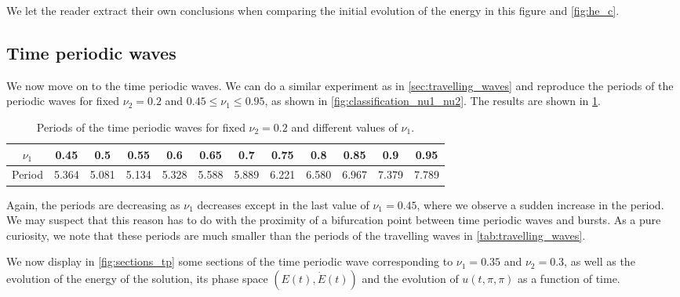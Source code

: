 \documentclass[twoside]{article}
\begin{document}
We let the reader extract their own conclusions when comparing the initial evolution of the energy in this figure and \cref{fig:he_c}.
\subsection{Time periodic waves}\label{sec:time_periodic_waves}
We now move on to the time periodic waves. We can do a similar experiment as in \cref{sec:travelling_waves} and reproduce the periods of the periodic waves for fixed $\nu_2=0.2$ and $0.45\leq \nu_1\leq 0.95$, as shown in \cref{fig:classification_nu1_nu2}. The results are shown in \cref{tab:time_periodic_waves}.

\begin{table}[ht]
  \centering
  \begin{tabular}{|c||ccccccccccc|}
    \hline
    $\nu_1$ & 0.45  & 0.5   & 0.55  & 0.6   & 0.65  & 0.7   & 0.75  & 0.8   & 0.85  & 0.9   & 0.95  \\ \hline
    Period  & 5.364 & 5.081 & 5.134 & 5.328 & 5.588 & 5.889 & 6.221 & 6.580 & 6.967 & 7.379 & 7.789 \\
    \hline
  \end{tabular}
  \caption{Periods of the time periodic waves for fixed $\nu_2=0.2$ and different values of $\nu_1$.}
  \label{tab:time_periodic_waves}
\end{table}

Again, the periods are decreasing as $\nu_1$ decreases except in the last value of $\nu_1=0.45$, where we observe a sudden increase in the period. We may suspect that this reason has to do with the proximity of a bifurcation point between time periodic waves and bursts. As a pure curiosity, we note that these periods are much smaller than the periods of the travelling waves in \cref{tab:travelling_waves}.

We now display in \cref{fig:sections_tp} some sections of the time periodic wave corresponding to $\nu_1=0.35$ and $\nu_2=0.3$, as well as the evolution of the energy of the solution, its phase space $(E(t), \dot{E}(t))$ and the evolution of $u(t,\pi,\pi)$ as a function of time.
\end{document}
